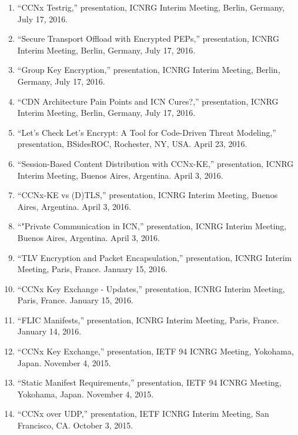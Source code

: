 \documentclass[10pt]{res} %
\begin{document}
\begin{resume}
\begin{enumerate}[T-1.]
\item ``CCNx Testrig,'' presentation, ICNRG Interim Meeting, Berlin, Germany, July 17, 2016.

\item ``Secure Transport Offload with Encrypted PEPs,'' presentation, ICNRG Interim Meeting, Berlin, Germany, July 17, 2016.

\item ``Group Key Encryption,'' presentation, ICNRG Interim Meeting, Berlin, Germany, July 17, 2016.

\item ``CDN Architecture Pain Points and ICN Cures?,'' presentation, ICNRG Interim Meeting, Berlin, Germany, July 17, 2016.

\item ``Let's Check Let's Encrypt: A Tool for Code-Driven Threat Modeling,'' presentation, BSidesROC, Rochester, NY, USA. April 23, 2016.

\item ``Session-Based Content Distribution with CCNx-KE,'' presentation, ICNRG Interim Meeting, Buenos Aires, Argentina. April 3, 2016.

\item ``CCNx-KE vs (D)TLS,'' presentation, ICNRG Interim Meeting, Buenos Aires, Argentina. April 3, 2016.

\item ``"Private Communication in ICN,'' presentation, ICNRG Interim Meeting, Buenos Aires, Argentina. April 3, 2016.

\item ``TLV Encryption and Packet Encapsulation,'' presentation, ICNRG Interim Meeting, Paris, France. January 15, 2016.

\item ``CCNx Key Exchange - Updates,'' presentation, ICNRG Interim Meeting, Paris, France. January 15, 2016.

\item ``FLIC Manifests,'' presentation, ICNRG Interim Meeting, Paris, France. January 14, 2016.

\item ``CCNx Key Exchange,'' presentation, IETF 94 ICNRG Meeting, Yokohama, Japan. November 4, 2015.

\item ``Static Manifest Requirements,'' presentation, IETF 94 ICNRG Meeting, Yokohama, Japan. November 4, 2015.

\item ``CCNx over UDP,'' presentation, IETF ICNRG Interim Meeting, San Francisco, CA. October 3, 2015.


\end{enumerate}
\end{resume}
\end{document}
